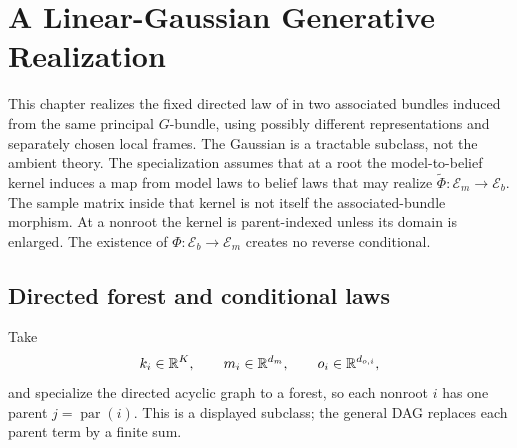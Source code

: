 \chapter{A Linear-Gaussian Generative Realization}
\label{ch:generative-gaussian}

This chapter realizes the fixed directed law of  in two
associated bundles induced from the same principal $G$-bundle, using possibly
different representations and separately chosen local frames. The Gaussian
is a tractable subclass, not the ambient theory. The specialization assumes that
at a root the model-to-belief kernel induces a map from model laws to belief laws that may realize
$\widetilde\Phi:\mathcal E_m\to\mathcal E_b$.  The sample matrix inside that kernel is not itself
the associated-bundle morphism.  At a nonroot the kernel is parent-indexed unless its domain is
enlarged.  The existence of $\Phi:\mathcal E_b\to\mathcal E_m$ creates no reverse conditional.

\section{Directed forest and conditional laws}
\label{sec:gen-gaussian}

Take
\begin{equation}
k_i\in\mathbb R^K,
\qquad
m_i\in\mathbb R^{d_m},
\qquad
o_i\in\mathbb R^{d_{o,i}},
\label{eq:gen-lg-domains}
\end{equation}
and specialize the directed acyclic graph to a forest, so each nonroot $i$ has one parent
$j=\operatorname{par}(i)$.  This is a displayed subclass; the general DAG replaces each parent
term by a finite sum. \label{def:gen-lg-forest}

